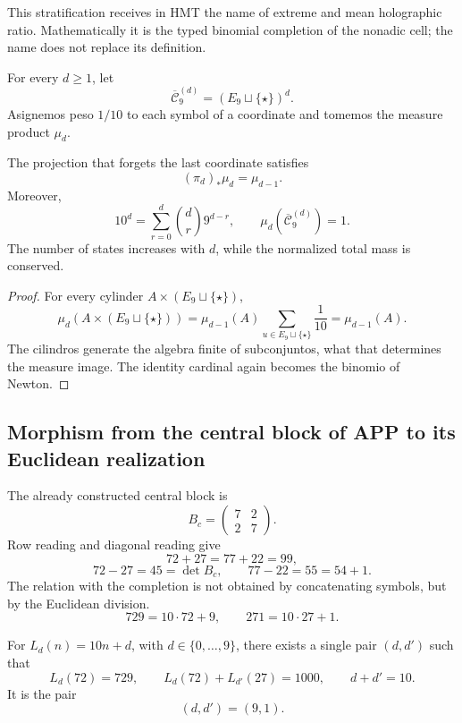 This stratification receives in HMT the name of extreme and mean
holographic ratio. Mathematically it is the typed binomial completion of the nonadic cell;
the name does not replace its definition.

For every \(d\geq1\), let
\[
 \overline{\mathcal C}^{(d)}_9=(E_9\sqcup\{\star\})^d.
\]
Asignemos peso \(1/10\) to each symbol of a coordinate and tomemos the measure
product \(\mu_d\).

\begin{theorem}
\label{p12-83-c1-s5:thm:medida-proyectiva-completacion}
The projection that forgets the last coordinate satisfies
\[
 (\pi_d)_*\mu_d=\mu_{d-1}.
\]
Moreover,
\[
 10^d=\sum_{r=0}^{d}\binom dr9^{d-r},
 \qquad
 \mu_d(\overline{\mathcal C}^{(d)}_9)=1.
\]
The number of states increases with \(d\), while the normalized total mass
is conserved.
\end{theorem}

\begin{proof}
For every cylinder \(A\times(E_9\sqcup\{\star\})\),
\[
 \mu_d(A\times(E_9\sqcup\{\star\}))
 =\mu_{d-1}(A)\sum_{u\in E_9\sqcup\{\star\}}\frac1{10}
 =\mu_{d-1}(A).
\]
The cilindros generate the algebra finite of subconjuntos, what that determines the
measure image. The identity cardinal again becomes the binomio of Newton.
\end{proof}

\subsection{Morphism from the central block of APP to its Euclidean realization}

The already constructed central block is
\[
 B_c=\begin{pmatrix}7&2\\2&7\end{pmatrix}.
\]
Row reading and diagonal reading give
\[
 72+27=77+22=99,
\]
\[
 72-27=45=\det B_c,
 \qquad
 77-22=55=54+1.
\]
The relation with the completion is not obtained by concatenating symbols, but by the Euclidean division.
\[
 729=10\cdot72+9,
 \qquad
 271=10\cdot27+1.
\]

\begin{theorem}
\label{p12-83-c1-s5:thm:levantamiento-decimal-emrh-autonomo}
For \(L_d(n)=10n+d\), with \(d\in\{0,\ldots,9\}\), there exists a single pair
\((d,d')\) such that
\[
 L_d(72)=729,
 \qquad
 L_d(72)+L_{d'}(27)=1000,
 \qquad
 d+d'=10.
\]
It is the pair
\[
 (d,d')=(9,1).
\]
\end{theorem}

